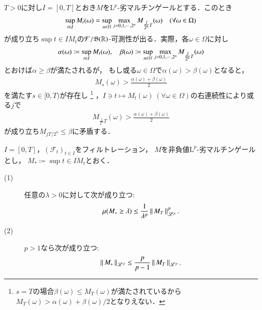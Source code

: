 	$T > 0$に対し$I = [0,T]$とおき$M$を$\mathrm{L}^p$-劣マルチンゲールとする．このとき
	\begin{align}
		\operatorname*{sup}_{t \in I} M_t(\omega) = \operatorname*{sup}_{n \in \mathbb{N}} \operatorname*{max}_{j=0,1,\cdots,2^n} M_{\tfrac{j}{2^n}T}(\omega) \quad (\forall \omega \in \Omega)
	\end{align}
	が成り立ち$\sup{t \in I}{M_t}$の$\mathcal{F}/\mathfrak{B}(\mathbb{R})$-可測性が出る．実際，各$\omega \in \Omega$に対し
	\begin{align}
		\alpha(\omega) \coloneqq \operatorname*{sup}_{t \in I} M_t(\omega),
		\quad \beta(\omega) \coloneqq \operatorname*{sup}_{n \in \mathbb{N}} \operatorname*{max}_{j=0,1,\cdots,2^n} M_{\tfrac{j}{2^n}T}(\omega)
	\end{align}
	とおけば$\alpha \geq \beta$が満たされるが，
	もし或る$\omega \in \Omega$で$\alpha(\omega) > \beta(\omega)$となると，
	\begin{align}
		M_s(\omega) > \frac{\alpha(\omega) + \beta(\omega)}{2}
	\end{align}
	を満たす$s \in [0,T)$が存在し
	\footnote{
		$s = T$の場合$\beta(\omega) \leq M_T(\omega)$が満たされているから$M_T(\omega) > \alpha(\omega) + \beta(\omega)/2$となりえない．
	}
	，$I \ni t \longmapsto M_t(\omega)\ (\forall \omega \in \Omega)$の右連続性により或る$j$で
	\begin{align}
		M_{\tfrac{j}{2^n}T}(\omega) > \frac{\alpha(\omega) + \beta(\omega)}{2}
	\end{align}
	が成り立ち$M_{jT/2^n} \leq \beta$に矛盾する．
	
	\begin{screen}
		\begin{thm}[Doobの不等式(2)]
			$I=[0,T]$，$(\mathcal{F}_t)_{t \in I}$をフィルトレーション，
			$M$を非負値$\mathrm{L}^p$-劣マルチンゲールとし，
			$M_* \coloneqq \sup{t \in I}{M_t}$とおく．
			\begin{description}
				\item[(1)] 任意の$\lambda > 0$に対して次が成り立つ:
					\begin{align}
						\mu(M_* \geq \lambda) \leq \frac{1}{\lambda^p} \left\|\, M_T\, \right\|_{\mathscr{L}^p}^p.
					\end{align}
				\item[(2)] $p > 1$なら次が成り立つ:
					\begin{align}
						\left\|\, M_*\, \right\|_{\mathscr{L}^p} \leq \frac{p}{p-1} \left\|\, M_T\, \right\|_{\mathscr{L}^p}.
					\end{align}
			\end{description}
		\label{thm:Doob_inequality_2}	
		\end{thm}
	\end{screen}
	
